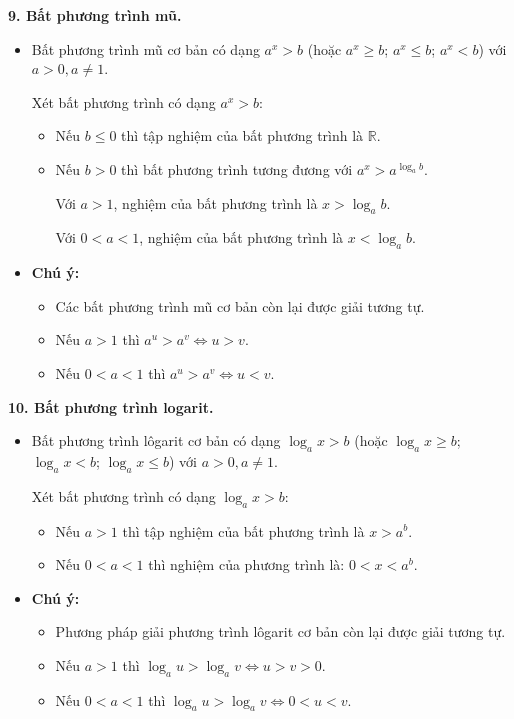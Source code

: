 \documentclass[12pt,a4paper]{extarticle}
\begin{document}
\vspace{0.4cm}
\noindent\textbf{9. Bất phương trình mũ.}
\begin{itemize}
    \item Bất phương trình mũ cơ bản có dạng $a^x > b$ (hoặc $a^x \ge b$; $a^x \le b$; $a^x < b$) với $a > 0, a \ne 1$.
    
    Xét bất phương trình có dạng $a^x > b$:
    \begin{itemize}
        \item[-] Nếu $b \le 0$ thì tập nghiệm của bất phương trình là $\mathbb{R}$.
        \item[-] Nếu $b > 0$ thì bất phương trình tương đương với $a^x > a^{\log_a b}$.
        
        Với $a > 1$, nghiệm của bất phương trình là $x > \log_a b$.
        
        Với $0 < a < 1$, nghiệm của bất phương trình là $x < \log_a b$.
    \end{itemize}
    \item \textbf{Chú ý:}
    \begin{itemize}
        \item[-] Các bất phương trình mũ cơ bản còn lại được giải tương tự.
        \item[-] Nếu $a > 1$ thì $a^u > a^v \Leftrightarrow u > v$.
        \item[-] Nếu $0 < a < 1$ thì $a^u > a^v \Leftrightarrow u < v$.
    \end{itemize}
\end{itemize}

\noindent\textbf{10. Bất phương trình logarit.}
\begin{itemize}
    \item Bất phương trình lôgarit cơ bản có dạng $\log_a x > b$ (hoặc $\log_a x \ge b$; $\log_a x < b$; $\log_a x \le b$) với $a > 0, a \ne 1$.
    
    Xét bất phương trình có dạng $\log_a x > b$:
    \begin{itemize}
        \item[-] Nếu $a > 1$ thì tập nghiệm của bất phương trình là $x > a^b$.
        \item[-] Nếu $0 < a < 1$ thì nghiệm của phương trình là: $0 < x < a^b$.
    \end{itemize}
    \item \textbf{Chú ý:}
    \begin{itemize}
        \item[-] Phương pháp giải phương trình lôgarit cơ bản còn lại được giải tương tự.
        \item[-] Nếu $a > 1$ thì $\log_a u > \log_a v \Leftrightarrow u > v > 0$.
        \item[-] Nếu $0 < a < 1$ thì $\log_a u > \log_a v \Leftrightarrow 0 < u < v$.
    \end{itemize}
\end{itemize}
\end{document}
